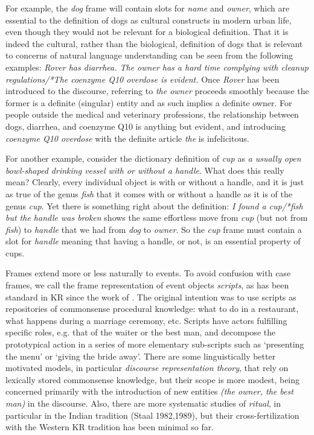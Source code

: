 For example, the {\it dog} frame will contain slots for {\it name} and {\it
owner}, which are essential to the definition of dogs as cultural constructs
in modern urban life, even though they would not be relevant for a biological
definition.  That it is indeed the cultural, rather than the biological,
definition of dogs that is relevant to concerns of natural language
understanding can be seen from the following examples: {\it Rover has
diarrhea. The owner has a hard time complying with cleanup regulations/*The
coenzyme Q10 overdose is evident.} Once {\it Rover} has been introduced to the
discourse, referring to {\it the owner} proceeds smoothly because the former
is a definite (singular) entity and as such implies a definite owner. For
people outside the medical and veterinary professions, the relationship between
dogs, diarrhea, and coenzyme Q10 is anything but evident, and introducing {\it
coenzyme Q10 overdose} with the definite article {\it the} is infelicitous. 

For another example, consider the dictionary definition of {\it cup} as {\it a
  usually open bowl-shaped drinking vessel with or without a handle}. What
does this really mean? Clearly, every individual object is with or without a
handle, and it is just as true of the genus {\it fish} that it comes with or
without a handle as it is of the genus {\it cup}. Yet there is something right
about the definition: {\it I found a cup/*fish but the handle was broken}
shows the same effortless move from {\it cup} (but not from {\it fish}) to
{\it handle} that we had from {\it dog} to {\it owner}. So the {\it cup} frame
must contain a slot for {\it handle} meaning that having a handle, or not, is
an essential property of cups.

Frames extend more or less naturally to events. To avoid confusion with case
frames, we call the frame representation of event objects {\it scripts}, as
has been standard in KR since the work of . The original
intention was to use scripts as repositories of commonsense procedural
knowledge: what to do in a restaurant, what happens during a marriage
ceremony, etc. Scripts have actors fulfilling specific roles, e.g. that of the
waiter or the best man, and decompose the prototypical action in a series of
more elementary sub-scripts such as `presenting the menu' or `giving the bride
away'. There are some linguistically better motivated models, in particular
{\it discourse representation theory}, that rely on lexically stored
commonsense knowledge, but their scope is more modest, being concerned
primarily with the introduction of new entities {\it (the owner, the best
  man)} in the discourse.  Also, there are more systematic studies of {\sl
  ritual}, in particular in the Indian tradition (Staal
1982,1989),\nocite{Staal:1982,Staal:1989} but their cross-fertilization with
the Western KR tradition has been minimal so far.

